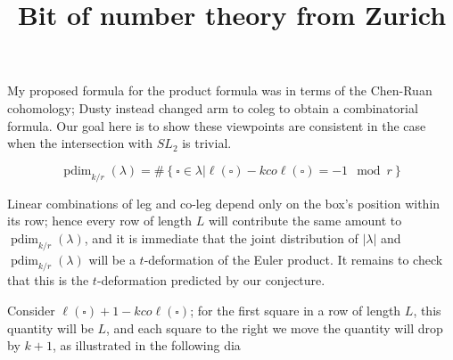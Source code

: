 \documentclass{amsart}
\title{Bit of number theory from Zurich}
\DeclareMathOperator{\dusty}{pdim}
\begin{document}
My proposed formula for the product formula was in terms of the Chen-Ruan cohomology; Dusty instead changed arm to coleg to obtain a combinatorial formula.  Our goal here is to show these viewpoints are consistent in the case when the intersection with $SL_2$ is trivial.

$$\dusty_{k/r}(\lambda)=\#\left\{\square\in\lambda\Big| \ell(\square)-kco\ell(\square)=-1\mod r\right\}$$
 
Linear combinations of leg and co-leg depend only on the box's position within its row; hence every row of length $L$ will contribute the same amount to $\dusty_{k/r}(\lambda)$, and it is immediate that the joint distribution of $|\lambda|$ and $\dusty_{k/r}(\lambda)$ will be a $t$-deformation of the Euler product.  It remains to check that this is the $t$-deformation predicted by our conjecture.

Consider $\ell(\square)+1-kco\ell(\square)$; for the first square in a row of length $L$, this quantity will be $L$, and each square to the right we move the quantity will drop by $k+1$, as illustrated in the following dia
\end{document}
